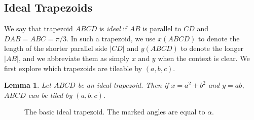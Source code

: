 \documentclass{amsart}
\theoremstyle{plain}
\newtheorem{lem}{Lemma}
\theoremstyle{definition}
\begin{document}
\subsection{Ideal Trapezoids}
\label{sec:trapezoids}

We say that trapezoid $ABCD$ is \emph{ideal} if $AB$ is parallel to $CD$ and $DAB = ABC = \pi/3$. In such a trapezoid, we use $x(ABCD)$ to denote the length of the shorter parallel side $|CD|$ and $y(ABCD)$ to denote the longer $|AB|$, and we abbreviate them as simply $x$ and $y$ when the context is clear. We first explore which trapezoids are tileable by $(a,b,c)$.

\begin{lem}
    \label{lem:trapezoid-1} Let $ABCD$ be an ideal trapezoid.  Then if $x = a^2 + b^2$ and $y = ab$, $ABCD$ can be tiled by $(a,b,c)$.
\end{lem}

\begin{figure}
    \centering
    \caption{The basic ideal trapezoid. The marked angles are equal to $\alpha$.}
    \label{fig:ideal-trapezoid-basic}
\end{figure}
\end{document}
